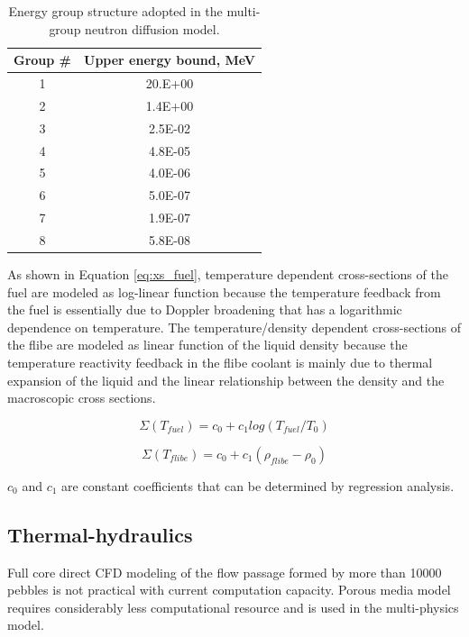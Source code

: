 \documentclass{elsarticle}
\begin{document}
\begin{table}
\caption{Energy group structure adopted in the multi-group neutron diffusion model.}
  \centering
  \begin{tabular}{cc}
  Group \# & Upper energy bound, MeV\\
  \hline
  1 & 20.E+00\\
  2 & 1.4E+00\\
  3 & 2.5E-02\\
  4 & 4.8E-05\\
  5 & 4.0E-06\\
  6 & 5.0E-07\\
  7 & 1.9E-07\\
  8 & 5.8E-08\\
  \hline
  \end{tabular}
  \label{tab:egroup}
\end{table}

As shown in Equation \ref{eq:xs_fuel}, temperature dependent cross-sections of the fuel are modeled as log-linear function because the temperature feedback from the fuel is essentially due to Doppler broadening that has a logarithmic dependence on temperature. The temperature/density dependent cross-sections of the flibe are modeled as linear function of the liquid density because the temperature reactivity feedback in the flibe coolant is mainly due to thermal expansion of the liquid and the linear relationship between the density and the macroscopic cross sections.

\begin{equation}
  \Sigma(T_{fuel}) = c_0 + c_1log(T_{fuel}/T_0)
\label{eq:xs_fuel}   
\end{equation}

\begin{equation}
  \Sigma(T_{flibe}) = c_0 + c_1(\rho_{flibe} - \rho_0)
\label{eq:xs_flibe}   
\end{equation}

$c_0$ and $c_1$ are constant coefficients that can be determined by regression analysis.






\subsection{Thermal-hydraulics}
Full core direct CFD modeling of the flow passage formed by more than 10000 pebbles is not practical with current computation capacity. Porous media model requires considerably less computational resource and is used in the multi-physics model.
\end{document}
